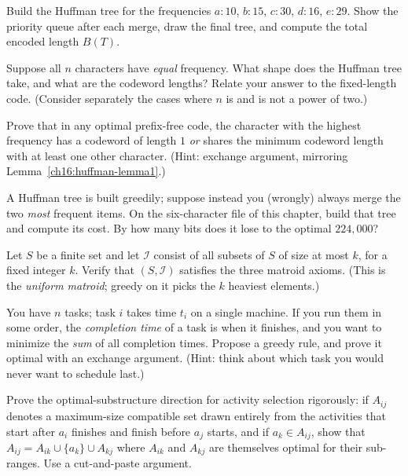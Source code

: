 \begin{exercise}
Build the Huffman tree for the frequencies $a{:}10$, $b{:}15$, $c{:}30$,
$d{:}16$, $e{:}29$. Show the priority queue after each merge, draw the final
tree, and compute the total encoded length $B(T)$.
\end{exercise}

\begin{exercise}
Suppose all $n$ characters have \emph{equal} frequency. What shape does the
Huffman tree take, and what are the codeword lengths? Relate your answer to the
fixed-length code. (Consider separately the cases where $n$ is and is not a power
of two.)
\end{exercise}

\begin{exercise}
Prove that in any optimal prefix-free code, the character with the highest
frequency has a codeword of length $1$ \emph{or} shares the minimum codeword
length with at least one other character. (Hint: exchange argument, mirroring
Lemma~\ref{ch16:huffman-lemma1}.)
\end{exercise}

\begin{exercise}
A Huffman tree is built greedily; suppose instead you (wrongly) always merge the
two \emph{most} frequent items. On the six-character file of this chapter, build
that tree and compute its cost. By how many bits does it lose to the optimal
$224{,}000$?
\end{exercise}

\begin{exercise}
Let $S$ be a finite set and let $\mathcal{I}$ consist of all subsets of $S$ of
size at most $k$, for a fixed integer $k$. Verify that $(S, \mathcal{I})$
satisfies the three matroid axioms. (This is the \emph{uniform matroid}; greedy
on it picks the $k$ heaviest elements.)
\end{exercise}

\begin{exercise}[Challenge]
You have $n$ tasks; task $i$ takes time $t_i$ on a single machine. If you run them
in some order, the \emph{completion time} of a task is when it finishes, and you
want to minimize the \emph{sum} of all completion times. Propose a greedy rule,
and prove it optimal with an exchange argument. (Hint: think about which task you
would never want to schedule last.)
\end{exercise}

\begin{exercise}[Challenge]
Prove the optimal-substructure direction for activity selection rigorously: if
$A_{ij}$ denotes a maximum-size compatible set drawn entirely from the activities
that start after $a_i$ finishes and finish before $a_j$ starts, and if $a_k \in
A_{ij}$, show that $A_{ij} = A_{ik} \cup \{a_k\} \cup A_{kj}$ where $A_{ik}$ and
$A_{kj}$ are themselves optimal for their sub-ranges. Use a cut-and-paste
argument.
\end{exercise}
